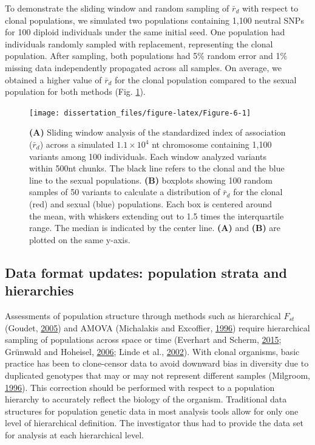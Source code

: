 \documentclass[double,12pt]{beavtex}
\begin{document}
  To demonstrate the sliding window and random sampling of \(\bar{r}_d\)
  with respect to clonal populations, we simulated two populations
  containing 1,100 neutral SNPs for 100 diploid individuals under the same
  initial seed. One population had individuals randomly sampled with
  replacement, representing the clonal population. After sampling, both
  populations had 5\% random error and 1\% missing data independently
  propagated across all samples. On average, we obtained a higher value of
  \(\bar{r}_d\) for the clonal population compared to the sexual
  population for both methods (Fig. \ref{fig:Figure-6}).
  
  \begin{figure}
  
  {\centering \texttt{[image: dissertation\_files/figure-latex/Figure-6-1]} 
  
  }
  
  \caption[Sliding window analysis of the standardized index of association
  (\(\bar{r}_d\))]{\textbf{(A)} Sliding window analysis of the standardized index of
  association (\(\bar{r}_d\)) across a simulated \(1.1 \times 10^4\) nt
  chromosome containing 1,100 variants among 100 individuals. Each window
  analyzed variants within 500nt chunks. The black line refers to the
  clonal and the blue line to the sexual populations. \textbf{(B)}
  boxplots showing 100 random samples of 50 variants to calculate a
  distribution of \(\bar{r}_d\) for the clonal (red) and sexual (blue)
  populations. Each box is centered around the mean, with whiskers
  extending out to 1.5 times the interquartile range. The median is
  indicated by the center line. \textbf{(A)} and \textbf{(B)} are plotted
  on the same y-axis.}\label{fig:Figure-6}
  \end{figure}
  
  \subsection{Data format updates: population strata and
  hierarchies}\label{data-format-updates-population-strata-and-hierarchies}
  
  Assessments of population structure through methods such as hierarchical
  \(F_{st}\) (Goudet, \protect\hyperlink{ref-goudet2005hierfstat}{2005})
  and AMOVA (Michalakis and Excoffier,
  \protect\hyperlink{ref-michalakis1996generic}{1996}) require
  hierarchical sampling of populations across space or time (Everhart and
  Scherm, \protect\hyperlink{ref-everhart2014fine}{2015}; Grünwald and
  Hoheisel, \protect\hyperlink{ref-grunwald2006hierarchical}{2006}; Linde
  et al., \protect\hyperlink{ref-linde2002population}{2002}). With clonal
  organisms, basic practice has been to clone-censor data to avoid
  downward bias in diversity due to duplicated genotypes that may or may
  not represent different samples (Milgroom,
  \protect\hyperlink{ref-milgroom1996recombination}{1996}). This
  correction should be performed with respect to a population hierarchy to
  accurately reflect the biology of the organism. Traditional data
  structures for population genetic data in most analysis tools allow for
  only one level of hierarchical definition. The investigator thus had to
  provide the data set for analysis at each hierarchical level.
  
\end{document}
